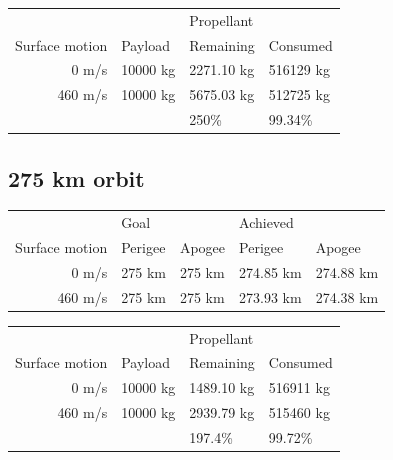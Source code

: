 \documentclass[11pt]{article}
\begin{document}
\begin{center}
  \begin{tabular}{ r   l   l l }
     &  & Propellant &  \\
    Surface motion & Payload & Remaining & Consumed \\
    \hline
    0 m/s & 10000 kg & 2271.10 kg  & 516129 kg \\
    460 m/s & 10000 kg & 5675.03 kg  & 512725 kg \\
    \hline
      &   & 250\%  & 99.34\% \\
  \end{tabular}
\end{center}

\subsection{275 km orbit}
\begin{center}
  \begin{tabular}{ r | l   l | l   l }
     & Goal  &  & Achieved &  \\
    Surface motion & Perigee & Apogee & Perigee & Apogee \\
    \hline
    0 m/s & 275 km & 275 km & 274.85 km & 274.88 km \\
    460 m/s & 275 km & 275 km & 273.93 km & 274.38 km
  \end{tabular}
\end{center}

\begin{center}
  \begin{tabular}{ r   l   l l }
     &  & Propellant &  \\
    Surface motion & Payload & Remaining & Consumed \\
    \hline
    0 m/s & 10000 kg & 1489.10 kg  & 516911 kg \\
    460 m/s & 10000 kg & 2939.79 kg  & 515460 kg \\
    \hline
      &   & 197.4\%  & 99.72\% \\
  \end{tabular}
\end{center}
\end{document}
